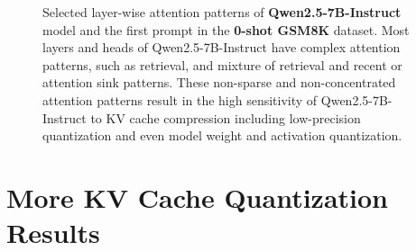 \begin{figure}
\begin{subfigure}{0.72\columnwidth}
    \label{fig:attention_pattern_qwen2.5-7b-instruct_gsm8k_zeroshot_first_prompt_layer_27}
    \end{subfigure}
    \caption{Selected layer-wise attention patterns of \textbf{Qwen2.5-7B-Instruct} model and the first prompt in the \textbf{0-shot GSM8K} dataset. Most layers and heads of Qwen2.5-7B-Instruct have complex attention patterns, such as retrieval, and mixture of retrieval and recent or attention sink patterns. These non-sparse and non-concentrated attention patterns result in the high sensitivity of Qwen2.5-7B-Instruct to KV cache compression including low-precision quantization and even model weight and activation quantization.}
\label{fig:selected_layer_wise_attention_patterns_Qwen2.5-7BB-Instruct_gsm8k_zeroshot_first_prompt}
\end{figure}

\section{More KV Cache Quantization Results}
